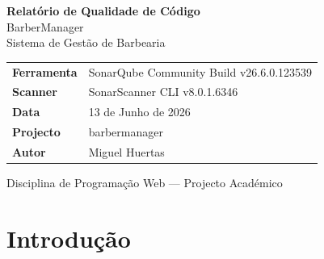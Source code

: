 \documentclass[12pt,a4paper]{article}
\begin{document}
\begin{titlepage}
    \centering
    \vspace*{2cm}

    {\Huge\bfseries\color{headerbg} Relatório de Qualidade de Código}\\[0.5cm]
    {\Large\color{sonargray} BarberManager}\\[0.3cm]
    {\normalsize\color{sonargray} Sistema de Gestão de Barbearia}

    \vspace{1.5cm}

    \begin{tabular}{ll}
        \toprule
        \textbf{Ferramenta} & SonarQube Community Build v26.6.0.123539 \\
        \textbf{Scanner}    & SonarScanner CLI v8.0.1.6346 \\
        \textbf{Data}       & 13 de Junho de 2026 \\
        \textbf{Projecto}   & barbermanager \\
        \textbf{Autor}      & Miguel Huertas \\
        \bottomrule
    \end{tabular}

    \vspace{2cm}


    \vfill
    {\small\color{sonargray} Disciplina de Programação Web — Projecto Académico}
\end{titlepage}

\tableofcontents
\newpage

\section{Introdução}
\end{document}
